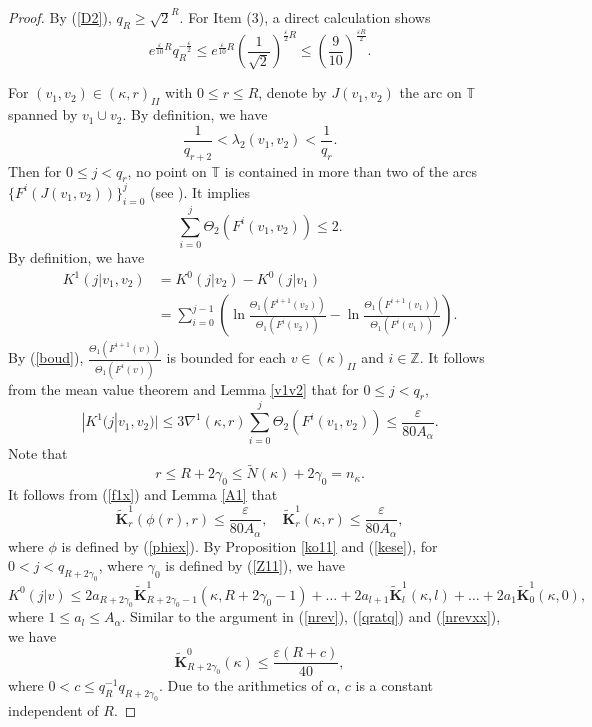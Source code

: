 \documentclass{amsart}
\theoremstyle{definition}
\begin{document}
\begin{proof}
By (\ref{D2}), $q_R\geq \sqrt{2}^{R}$. For Item (3), a direct calculation shows
\[e^{\frac{\varepsilon}{10}R}q_R^{-\frac{\varepsilon}{2}}\leq e^{\frac{\varepsilon}{10}R}(\frac{1}{\sqrt{2}})^{\frac{\varepsilon}{2}R}\leq (\frac{9}{10})^{\frac{\varepsilon R}{2}}.\]

For $(v_1,v_2)\in (\kappa,r)_{II}$ with $0\leq r\leq R$, denote by $J(v_1,v_2)$ the arc on $\mathbb{T}$ spanned by $v_1\cup v_2$. By definition, we have
\[\frac{1}{q_{r+2}}<\lambda_2(v_1,v_2)<\frac{1}{q_r}.\]
Then for $0\leq j<q_r$, no point on $\mathbb{T}$ is  contained in more than two of the arcs $\{F^i(J(v_1,v_2))\}_{i=0}^j$ (see \cite[p65, Proposition (8.3)]{H11}). It implies
\begin{equation}\label{hcir}
\sum_{i=0}^j\Theta_2(F^i(v_1,v_2))\leq 2.
\end{equation}
By definition, we have
\begin{align*}
	K^1(j|v_1,v_2)&=K^0(j|v_2)-K^0(j|v_1)\\
	&=\sum_{i=0}^{j-1}\left(\ln \frac{\Theta_1(F^{i+1}(v_2))}{\Theta_1(F^i(v_2))}-\ln \frac{\Theta_1(F^{i+1}(v_1))}{\Theta_1(F^i(v_1))}\right).
\end{align*}
By (\ref{boud}),  $\frac{\Theta_1(F^{i+1}(v))}{\Theta_1(F^i(v))}$ is bounded for each $v\in (\kappa)_{II}$ and $i\in \mathbb{Z}$. It follows from the mean value theorem and Lemma \ref{v1v2} that for $0\leq j<q_r$,
\begin{equation}\label{KIJ}
|K^1(j|v_1,v_2)|\leq3\nabla^1(\kappa,r)\sum_{i=0}^j\Theta_2(F^i(v_1,v_2))\leq \frac{\varepsilon}{80A_\alpha}.
\end{equation}
Note that \begin{equation}\label{Rgam}
r\leq R+2\gamma_0\leq \tilde{N}(\kappa)+2\gamma_0=n_{\kappa}.
\end{equation}
It follows from   (\ref{f1x}) and Lemma \ref{A1} that
\[\widetilde{\mathbf{K}}_{r}^1(\phi(r),r)\leq \frac{\varepsilon}{80A_\alpha},\quad\widetilde{\mathbf{K}}_{r}^1(\kappa,r)\leq \frac{\varepsilon}{80A_\alpha},\]
where $\phi$ is defined by (\ref{phiex}).
By Proposition \ref{ko11} and (\ref{kese}), for $0<j<q_{R+2\gamma_0}$, where $\gamma_0$ is defined by (\ref{Z11}), we have
\[K^0(j|v)\leq 2a_{R+2\gamma_0}\widetilde{\mathbf{K}}_{R+2\gamma_0-1}^1(\kappa,R+2\gamma_0-1)+\ldots+2a_{l+1}\widetilde{\mathbf{K}}_{l}^1(\kappa,l)+\ldots+2a_1\widetilde{\mathbf{K}}_0^1(\kappa,0),\]
where $1\leq a_l\leq A_\alpha$. Similar to the argument in (\ref{nrev}), (\ref{qratq}) and (\ref{nrevxx}), we have
\begin{equation}\label{newb}
\widetilde{\mathbf{K}}_{R+2\gamma_0}^0(\kappa)\leq \frac{\varepsilon (R+c)}{40},
\end{equation}
where $0<c\leq q^{-1}_{R}q_{R+2\gamma_0}$. Due to the arithmetics of $\alpha$, $c$ is a constant independent of $R$.


\end{proof}
\end{document}
